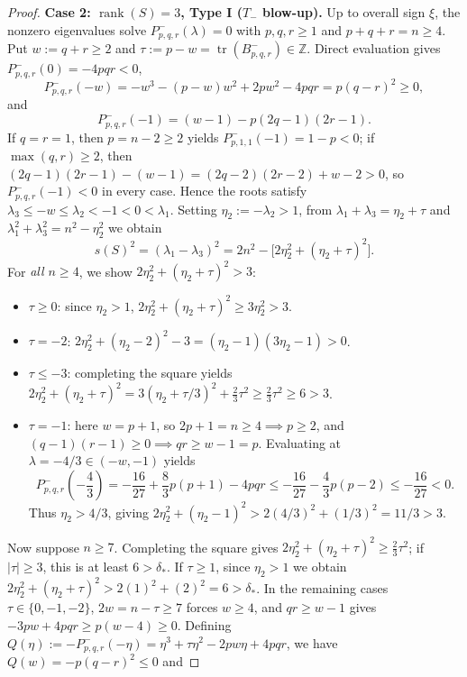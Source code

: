 \documentclass[11pt,reqno]{article}
\theoremstyle{definition}
\newcommand{\Z}{\mathbb{Z}}
\newcommand{\tr}{\operatorname{tr}}
\newcommand{\rank}{\operatorname{rank}}
\begin{document}
\begin{proof}
\medskip\noindent\textbf{Case 2: $\rank(S) = 3$, Type I ($T_-$ blow-up).}
Up to overall sign $\xi$, the nonzero eigenvalues solve $P^-_{p,q,r}(\lambda) = 0$ with $p, q, r \ge 1$ and $p + q + r = n \ge 4$. Put $w := q + r \ge 2$ and $\tau := p - w = \tr(B^-_{p,q,r}) \in \Z$. Direct evaluation gives $P^-_{p,q,r}(0) = -4pqr < 0$,
\[
P^-_{p,q,r}(-w) = -w^3 - (p-w)w^2 + 2pw^2 - 4pqr = p(q-r)^2 \ge 0,
\]
and
\[
P^-_{p,q,r}(-1) = (w - 1) - p(2q - 1)(2r - 1).
\]
If $q = r = 1$, then $p = n - 2 \ge 2$ yields $P^-_{p,1,1}(-1) = 1 - p < 0$; if $\max(q,r) \ge 2$, then $(2q-1)(2r-1) - (w - 1) = (2q-2)(2r-2) + w - 2 > 0$, so $P^-_{p,q,r}(-1) < 0$ in every case. Hence the roots satisfy $\lambda_3 \le -w \le \lambda_2 < -1 < 0 < \lambda_1$. Setting $\eta_2 := -\lambda_2 > 1$, from $\lambda_1 + \lambda_3 = \eta_2 + \tau$ and $\lambda_1^2 + \lambda_3^2 = n^2 - \eta_2^2$ we obtain
\begin{equation}\label{eq:rank3-exact-gap}
s(S)^2 = (\lambda_1 - \lambda_3)^2 = 2n^2 - \bigl[2\eta_2^2 + (\eta_2 + \tau)^2\bigr].
\end{equation}
For \emph{all $n \ge 4$}, we show $2\eta_2^2 + (\eta_2 + \tau)^2 > 3$:
\begin{itemize}
    \item $\tau \ge 0$: since $\eta_2 > 1$, $2\eta_2^2 + (\eta_2 + \tau)^2 \ge 3\eta_2^2 > 3$.
    \item $\tau = -2$: $2\eta_2^2 + (\eta_2 - 2)^2 - 3 = (\eta_2 - 1)(3\eta_2 - 1) > 0$.
    \item $\tau \le -3$: completing the square yields $2\eta_2^2 + (\eta_2 + \tau)^2 = 3(\eta_2 + \tau/3)^2 + \frac{2}{3}\tau^2 \ge \frac{2}{3}\tau^2 \ge 6 > 3$.
    \item $\tau = -1$: here $w = p + 1$, so $2p + 1 = n \ge 4 \implies p \ge 2$, and $(q-1)(r-1) \ge 0 \implies qr \ge w - 1 = p$. Evaluating at $\lambda = -4/3 \in (-w, -1)$ yields
    \[
    P^-_{p,q,r}\!\left(-\frac{4}{3}\right)
    = -\frac{16}{27} + \frac{8}{3}p(p+1) - 4pqr
    \le -\frac{16}{27} - \frac{4}{3}p(p - 2) \le -\frac{16}{27} < 0.
    \]
    Thus $\eta_2 > 4/3$, giving $2\eta_2^2 + (\eta_2 - 1)^2 > 2(4/3)^2 + (1/3)^2 = 11/3 > 3$.
\end{itemize}
Now suppose \emph{$n \ge 7$}. Completing the square gives $2\eta_2^2 + (\eta_2 + \tau)^2 \ge \frac{2}{3}\tau^2$; if $|\tau| \ge 3$, this is at least $6 > \delta_*$. If $\tau \ge 1$, since $\eta_2 > 1$ we obtain $2\eta_2^2 + (\eta_2 + \tau)^2 > 2(1)^2 + (2)^2 = 6 > \delta_*$. In the remaining cases $\tau \in \{0, -1, -2\}$, $2w = n - \tau \ge 7$ forces $w \ge 4$, and $qr \ge w - 1$ gives $-3pw + 4pqr \ge p(w - 4) \ge 0$. Defining $Q(\eta) := -P^-_{p,q,r}(-\eta) = \eta^3 + \tau \eta^2 - 2pw\eta + 4pqr$, we have $Q(w) = -p(q-r)^2 \le 0$ and

\end{proof}
\end{document}
